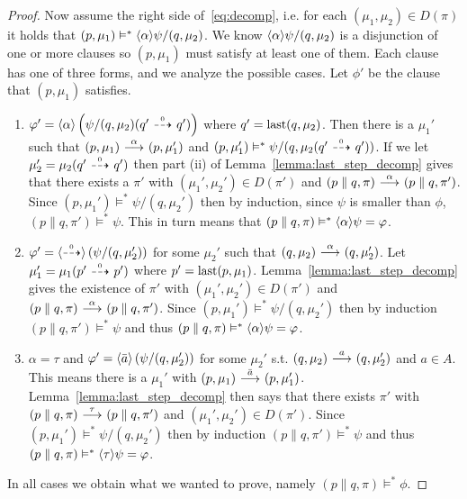 \begin{proof}
    \rtl Now assume the right side of~\eqref{eq:decomp}, i.e. for each $(\mu_1,\mu_2)
    \in D(\pi)$ it holds that $(p,\mu_1) \vDash^* \mbox{\ensuremath{\langle \alpha \rangle}}\psi / (q,\mu_2)$.
    We know $\mbox{\ensuremath{\langle \alpha \rangle}}\psi / (q,\mu_2)$ is a disjunction of one or more clauses
    so $(p,\mu_1)$ must satisfy at least one of them. Each clause has one of three
    forms, and we analyze the possible cases.
    Let $\phi'$ be the clause that $(p,\mu_1)$ satisfies.
    \begin{enumerate}
        \item $\varphi' = \mbox{\ensuremath{\langle \alpha \rangle}} \left(\psi / (q,\mu_2)(q' \ {\stackrel{_{0}}{\dashrightarrow}}\  q') \right)$
            where $q' = \operatorname{last}(q,\mu_2)$.
            Then there is a $\mu_1'$ such that $(p,\mu_1) \ {\stackrel{{\alpha}}{\longrightarrow}}\  (p,\mu_1')$
            and $(p,\mu_1') \vDash^* \psi/(q,\mu_2(q'\ {\stackrel{_{0}}{\dashrightarrow}}\ q'))$. If
            we let $\mu_2' = \mu_2(q' \ {\stackrel{_{0}}{\dashrightarrow}}\  q')$ then 
            part (ii) of
            Lemma~\ref{lemma:last_step_decomp}
            gives that there exists a $\pi'$ with $(\mu_1',\mu_2')\in D(\pi')$ and
            $(p\parallel q, \pi) \ {\stackrel{{\alpha}}{\longrightarrow}}\  (p\parallel q, \pi')$. Since $(p,\mu_1')
            \vDash^* \psi / (q,\mu_2')$ then by induction, since $\psi$ is smaller than
            $\phi$, $(p\parallel q, \pi') \vDash^* \psi$. This in turn means that
            $(p\parallel q, \pi) \vDash^* \mbox{\ensuremath{\langle \alpha \rangle}}\psi = \varphi$.
        \item $\varphi' = \mbox{\ensuremath{\langle\stackrel{_{0}}{\dashrightarrow}\rangle}} \left(\psi / (q,\mu_2')\right)$ for some $\mu_2'$
            such that $(q,\mu_2) \ {\stackrel{{\alpha}}{\longrightarrow}}\  (q,\mu_2')$. Let $\mu_1' = \mu_1(p'
            \ {\stackrel{_{0}}{\dashrightarrow}}\  p')$ where $p' = \operatorname{last}(p,\mu_1)$. Lemma~\ref{lemma:last_step_decomp}
            gives the existence of $\pi'$ with $(\mu_1',\mu_2')\in D(\pi')$ and $(p\parallel
            q,\pi) \ {\stackrel{{\alpha}}{\longrightarrow}}\  (p\parallel q, \pi')$. Since $(p,\mu_1')\vDash^* \psi
            / (q,\mu_2')$ then by induction $(p\parallel q,\pi') \vDash^* \psi$ and thus
            $(p\parallel q, \pi) \vDash^* \mbox{\ensuremath{\langle \alpha \rangle}}\psi = \varphi$.
        \item $\alpha = \tau$ and $\varphi' = \mbox{\ensuremath{\langle \bar{a} \rangle}} \left( \psi / (q,\mu_2') \right)$
            for some $\mu_2'$ s.t. $(q,\mu_2)\ {\stackrel{{a}}{\longrightarrow}}\ (q,\mu_2')$ and $a\in A$.
            This means there is a
            $\mu_1'$ with $(p,\mu_1) \ {\stackrel{{\bar{a}}}{\longrightarrow}}\  (p,\mu_1')$.
            Lemma~\ref{lemma:last_step_decomp} then says that there exists $\pi'$ with $(p
            \parallel q, \pi) \ {\stackrel{{\tau}}{\longrightarrow}}\  (p\parallel q, \pi')$ and $(\mu_1',\mu_2')
            \in D(\pi')$. Since $(p,\mu_1')\vDash^* \psi / (q,\mu_2')$ then by induction
            $(p\parallel q,\pi')\vDash^* \psi$ and thus $(p\parallel q, \pi) \vDash^*
            \mbox{\ensuremath{\langle \tau \rangle}}\psi = \varphi$.
    \end{enumerate}
    In all cases we obtain what we wanted to prove, namely $(p\parallel q, \pi) \vDash^* \phi$.



\end{proof}
